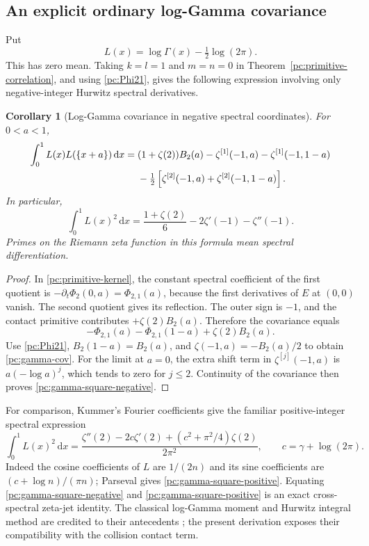 \documentclass[11pt,a4paper]{article}
\numberwithin{equation}{section}
\newtheorem{corollary}[theorem]{Corollary}
\theoremstyle{definition}
\newcommand{\dd}{\,\mathrm d}
\begin{document}
\subsection{An explicit ordinary log-Gamma covariance}
Put
\begin{equation}\label{pc:Lgamma}
L(x)=\log\Gamma(x)-\tfrac12\log(2\pi).
\end{equation}
This has zero mean. Taking $k=l=1$ and $m=n=0$ in Theorem~\ref{pc:primitive-correlation}, and using \eqref{pc:Phi21}, gives the following expression involving only negative-integer Hurwitz spectral derivatives.

\begin{corollary}[Log-Gamma covariance in negative spectral coordinates]\label{pc:gamma-cov-theorem}
For $0<a<1$,
\begin{align}
\int_0^1 L(x)L(\{x+a\})\dd x
={}&(1+\zeta(2))B_2(a)
-\zeta^{[1]}(-1,a)-\zeta^{[1]}(-1,1-a)\notag\\
&-\tfrac12\left[\zeta^{[2]}(-1,a)+\zeta^{[2]}(-1,1-a)\right].\label{pc:gamma-cov}
\end{align}
In particular,
\begin{equation}\label{pc:gamma-square-negative}
\int_0^1L(x)^2\dd x
=\frac{1+\zeta(2)}6-2\zeta'(-1)-\zeta''(-1).
\end{equation}
Primes on the Riemann zeta function in this formula mean spectral differentiation.
\end{corollary}
\begin{proof}
In \eqref{pc:primitive-kernel}, the constant spectral coefficient of the first quotient is $-\partial_t\Phi_2(0,a)=\Phi_{2,1}(a)$, because the first derivatives of $E$ at $(0,0)$ vanish. The second quotient gives its reflection. The outer sign is $-1$, and the contact primitive contributes $+\zeta(2)B_2(a)$. Therefore the covariance equals
\[
-\Phi_{2,1}(a)-\Phi_{2,1}(1-a)+\zeta(2)B_2(a).
\]
Use \eqref{pc:Phi21}, $B_2(1-a)=B_2(a)$, and $\zeta(-1,a)=-B_2(a)/2$ to obtain \eqref{pc:gamma-cov}. For the limit at $a=0$, the extra shift term in $\zeta^{[j]}(-1,a)$ is $a(-\log a)^j$, which tends to zero for $j\le2$. Continuity of the covariance then proves \eqref{pc:gamma-square-negative}.
\end{proof}
For comparison, Kummer's Fourier coefficients give the familiar positive-integer spectral expression
\begin{equation}\label{pc:gamma-square-positive}
\int_0^1L(x)^2\dd x
=\frac{\zeta''(2)-2c\zeta'(2)+(c^2+\pi^2/4)\zeta(2)}{2\pi^2},
\qquad c=\gamma+\log(2\pi).
\end{equation}
Indeed the cosine coefficients of $L$ are $1/(2n)$ and its sine coefficients are $(c+\log n)/(\pi n)$; Parseval gives \eqref{pc:gamma-square-positive}. Equating \eqref{pc:gamma-square-negative} and \eqref{pc:gamma-square-positive} is an exact cross-spectral zeta-jet identity. The classical log-Gamma moment and Hurwitz integral method are credited to their antecedents \cite{pc:EM,pc:coincident}; the present derivation exposes their compatibility with the collision contact term.
\end{document}
